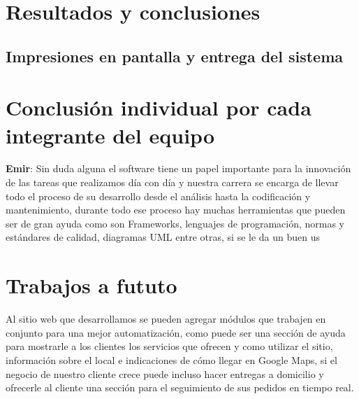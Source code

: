 \section{Resultados y conclusiones}


\subsection{Impresiones en pantalla y entrega del sistema}



\section{Conclusión individual por cada integrante del equipo}
\textbf{Emir}: Sin duda alguna el software tiene un papel importante para la innovación de las tareas que realizamos día con día y nuestra carrera se encarga de llevar todo el proceso de su desarrollo desde el análisis hasta la codificación y mantenimiento, durante todo ese proceso hay muchas herramientas que pueden ser de gran ayuda como son Frameworks, lenguajes de programación, normas y estándares de calidad, diagramas UML entre otras, si se le da un buen us

\section{Trabajos a fututo}
Al sitio web que desarrollamos se pueden agregar módulos que trabajen en conjunto para una mejor automatización, como puede ser una sección de ayuda para mostrarle a los clientes los servicios que ofrecen y como utilizar el sitio, información sobre el local e indicaciones de cómo llegar en Google Maps, si el negocio de nuestro cliente crece puede incluso hacer entregas a domicilio y ofrecerle al cliente una sección para el seguimiento de sus pedidos en tiempo real.
